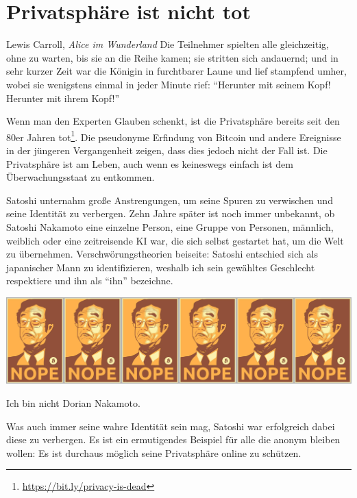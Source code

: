 \chapter{Privatsphäre ist nicht tot}
\label{les:19}

\begin{chapquote}{Lewis Carroll, \textit{Alice im Wunderland}}
Die Teilnehmer spielten alle gleichzeitig, ohne zu warten, bis sie an die Reihe
kamen; sie stritten sich andauernd; und in sehr kurzer Zeit war die Königin in
furchtbarer Laune und lief stampfend umher, wobei sie wenigstens einmal in jeder
Minute rief: \enquote{Herunter mit seinem Kopf! Herunter mit ihrem Kopf!}
\end{chapquote}

Wenn man den Experten Glauben schenkt, ist die Privatsphäre bereits seit den 80er
Jahren tot\footnote{\url{https://bit.ly/privacy-is-dead}}. Die pseudonyme
Erfindung von Bitcoin und andere Ereignisse in der jüngeren Vergangenheit zeigen,
dass dies jedoch nicht der Fall ist. Die Privatsphäre ist am Leben, auch wenn es
keineswegs einfach ist dem Überwachungsstaat zu entkommen.

Satoshi unternahm große Anstrengungen, um seine Spuren zu verwischen und seine
Identität zu verbergen. Zehn Jahre später ist noch immer unbekannt, ob Satoshi
Nakamoto eine einzelne Person, eine Gruppe von Personen, männlich, weiblich oder
eine zeitreisende KI war, die sich selbst gestartet hat, um die Welt zu
übernehmen. Verschwörungstheorien beiseite: Satoshi entschied sich als
japanischer Mann zu identifizieren, weshalb ich sein gewähltes Geschlecht
respektiere und ihn als \enquote{ihn} bezeichne.

\begin{center}
  \includegraphics[width=\textwidth]{assets/images/nope.png}
  \caption{Ich bin nicht Dorian Nakamoto.}
  \label{fig:nope}
\end{center}

\newpage

Was auch immer seine wahre Identität sein mag, Satoshi war erfolgreich dabei
diese zu verbergen. Es ist ein ermutigendes Beispiel für alle die anonym bleiben
wollen: Es ist durchaus möglich seine Privatsphäre online zu schützen.

